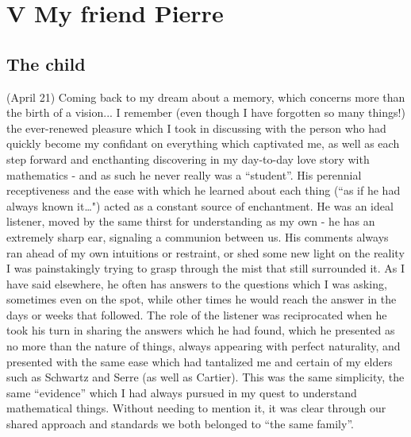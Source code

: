 \section{V My friend Pierre}

\subsection{The child}

 (April 21) Coming back to my dream about a memory, which concerns more than the
birth of a vision... I remember (even though I have forgotten so many things!) the
ever-renewed pleasure which I took in discussing
with the person who had quickly become my confidant on everything which captivated me,
as well as each step forward and encthanting discovering in my day-to-day
love story with mathematics - and as such he never really was a ``student''.
His perennial receptiveness and the ease with which he learned about each thing
(``as if he had always known it\ldots") acted as a constant source of enchantment.
He was an ideal listener, moved by the same thirst for understanding as my own - he has an
extremely sharp ear, signaling a communion between us.
His comments always ran ahead of my own intuitions or restraint,
or shed some new light on the reality I was painstakingly trying to grasp through the mist
that still surrounded it. As I have said elsewhere, he often has answers to the questions
which I was asking, sometimes even on the spot, while other times he would reach the
answer in the days or weeks that followed.
The role of the listener was reciprocated when he took his turn in sharing the answers
which he had found, which he presented as no more than the nature of things, always
appearing with perfect naturality, and presented with the same ease which had tantalized
me and certain of my elders such as Schwartz and Serre (as well as Cartier).
This was the same simplicity, the same ``evidence'' which I had always pursued in my
quest to understand mathematical things.
Without needing to mention it, it was clear through our shared approach and standards
we both belonged to ``the same family''.

